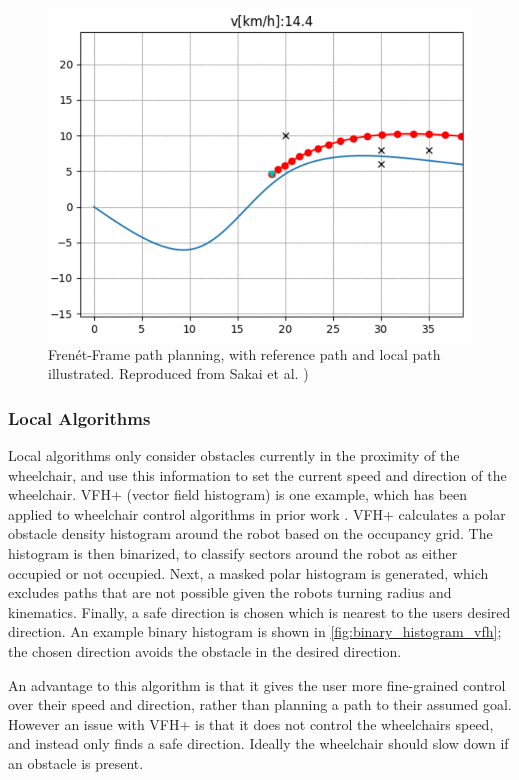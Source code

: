 \documentclass[12pt]{article}
\begin{document}
\begin{figure}[bp]
    \centering
    \includegraphics[width=0.5\linewidth]{images/frenet_frame_local_path.png}
    \caption{Fren\'et-Frame path planning, with reference path and local path illustrated. Reproduced from Sakai et al. \cite{sakaiPythonRoboticsPythonCode2018})}
    \label{fig:frenet_frame_local_path}
\end{figure}

\subsubsection{Local Algorithms}
Local algorithms only consider obstacles currently in the proximity of the wheelchair,
and use this information to set the current speed and direction of the wheelchair.
VFH+ (vector field histogram) \cite{ulrichVFHReliableObstacle1998} is one example, which
has been applied to wheelchair control algorithms in prior work \cite{tomariEnhancingWheelchairControl2014}.
VFH+ calculates a polar obstacle density histogram around the robot based on the occupancy grid.
The histogram is then binarized, to classify sectors around the robot as either occupied or not occupied.
Next, a masked polar histogram is generated, which excludes paths that are not possible given the robots
turning radius and kinematics. Finally, a safe direction is chosen which is nearest to the users desired direction.
An example binary histogram is shown in \cref{fig:binary_histogram_vfh}; the chosen direction avoids the obstacle in the
desired direction.

An advantage to this algorithm is that it gives the user more fine-grained control over their speed and direction,
rather than planning a path to their assumed goal.
However an issue with VFH+ is that it does not control the wheelchairs speed, and instead only finds a safe direction.
Ideally the wheelchair should slow down if an obstacle is present.
\end{document}
